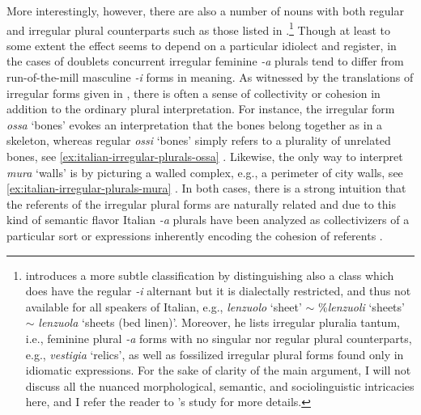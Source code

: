 More interestingly, however, there are also a number of nouns with both regular and irregular plural counterparts such as those listed in  .\footnote{\citet[pp. 124--129]{acquaviva2008lexical} introduces a more subtle classification by distinguishing also a class which does have the regular \textit{-i} alternant but it is dialectally restricted, and thus not available for all speakers of Italian, e.g., \textit{lenzuolo} `sheet' $\sim$ \%\textit{lenzuoli} `sheets' $\sim$ \textit{lenzuola} `sheets (bed linen)'. Moreover, he lists irregular pluralia tantum, i.e., feminine plural \textit{-a} forms with no singular nor regular plural counterparts, e.g., \textit{vestigia} `relics', as well as fossilized irregular plural forms found only in idiomatic expressions. For the sake of clarity of the main argument, I will not discuss all the nuanced morphological, semantic, and sociolinguistic intricacies here, and I refer the reader to \citeauthor{acquaviva2008lexical}'s study for more details.} Though at least to some extent the effect seems to depend on a particular idiolect and register, in the cases of doublets concurrent irregular feminine \textit{-a} plurals tend to differ from run-of-the-mill masculine \textit{-i} forms in meaning. As witnessed by the translations of irregular forms given in , there is often a sense of collectivity or cohesion in addition to the ordinary plural interpretation. For instance, the irregular form \textit{ossa} `bones' evokes an interpretation that the bones belong together as in a skeleton, whereas regular \textit{ossi} `bones' simply refers to a plurality of unrelated bones, see \ref{ex:italian-irregular-plurals-ossa} \citep[p. 153]{corbett2000number}. Likewise, the only way to interpret \textit{mura} `walls' is by picturing a walled complex, e.g., a perimeter of city walls, see \ref{ex:italian-irregular-plurals-mura} \citep[p. 150]{acquaviva2008lexical}. In both cases, there is a strong intuition that the referents of the irregular plural forms are naturally related and due to this kind of semantic flavor Italian \textit{-a} plurals have been analyzed as collectivizers of a particular sort \citep{ojeda1995semantics} or expressions inherently encoding the cohesion of referents \citep{acquaviva2008lexical}.\largerpage[2]

